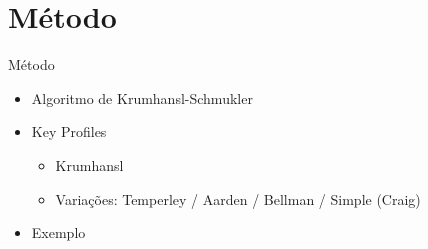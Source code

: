 \section{Método}
\begin{frame}{Método}{}
    \begin{itemize}
        \item Algoritmo de Krumhansl-Schmukler
        \item Key Profiles
        \begin{itemize}
            \item Krumhansl
            \item Variações: Temperley / Aarden / Bellman / Simple (Craig)
        \end{itemize}
        \item Exemplo
    \end{itemize}
\end{frame}

